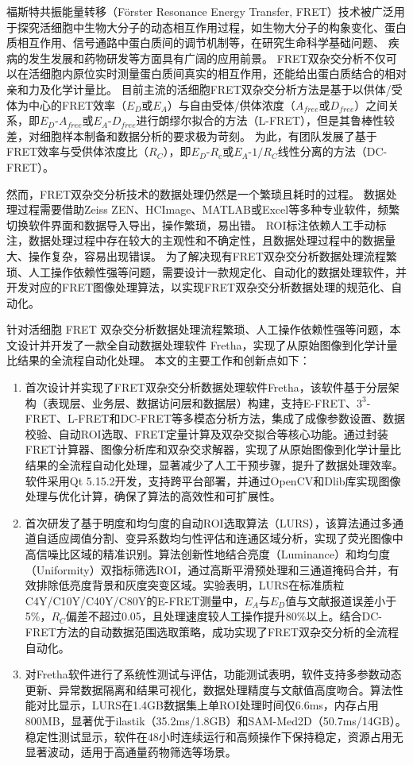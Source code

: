 \begin{cabstract}

\ifshowtext
福斯特共振能量转移（Förster Resonance Energy Transfer, FRET）技术被广泛用于探究活细胞中生物大分子的动态相互作用过程，如生物大分子的构象变化、蛋白质相互作用、信号通路中蛋白质间的调节机制等，在研究生命科学基础问题、 疾病的发生发展和药物研发等方面具有广阔的应用前景。
FRET双杂交分析不仅可以在活细胞内原位实时测量蛋白质间真实的相互作用，还能给出蛋白质结合的相对亲和力及化学计量比。
目前主流的活细胞FRET双杂交分析方法是基于以供体/受体为中心的FRET效率（$E_D$或$E_A$）与自由受体/供体浓度（$A_{free}$或$D_{free}$）之间关系，即$E_D$-$A_{free}$或$E_A$-$D_{free}$进行朗缪尔拟合的方法（L-FRET），但是其鲁棒性较差，对细胞样本制备和数据分析的要求极为苛刻。
为此，有团队发展了基于FRET效率与受供体浓度比（$R_C$），即$E_D$-$R_c$或$E_A$-$1/R_C$线性分离的方法（DC-FRET）。

然而，FRET双杂交分析技术的数据处理仍然是一个繁琐且耗时的过程。
数据处理过程需要借助Zeiss ZEN、HCImage、MATLAB或Excel等多种专业软件，频繁切换软件界面和数据导入导出，操作繁琐，易出错。
ROI标注依赖人工手动标注，数据处理过程中存在较大的主观性和不确定性，且数据处理过程中的数据量大、操作复杂，容易出现错误。
为了解决现有FRET双杂交分析数据处理流程繁琐、人工操作依赖性强等问题，需要设计一款规定化、自动化的数据处理软件，并开发对应的FRET图像处理算法，以实现FRET双杂交分析数据处理的规范化、自动化。

针对活细胞 FRET 双杂交分析数据处理流程繁琐、人工操作依赖性强等问题，本文设计并开发了一款全自动数据处理软件 Fretha，实现了从原始图像到化学计量比结果的全流程自动化处理。
本文的主要工作和创新点如下：
\begin{enumerate}
  \item 首次设计并实现了FRET双杂交分析数据处理软件Fretha，该软件基于分层架构（表现层、业务层、数据访问层和数据层）构建，支持E-FRET、$3^3$-FRET、L-FRET和DC-FRET等多模态分析方法，集成了成像参数设置、数据校验、自动ROI选取、FRET定量计算及双杂交拟合等核心功能。通过封装FRET计算器、图像分析库和双杂交求解器，实现了从原始图像到化学计量比结果的全流程自动化处理，显著减少了人工干预步骤，提升了数据处理效率。软件采用Qt 5.15.2开发，支持跨平台部署，并通过OpenCV和Dlib库实现图像处理与优化计算，确保了算法的高效性和可扩展性。
  \item 首次研发了基于明度和均匀度的自动ROI选取算法（LURS），该算法通过多通道自适应阈值分割、变异系数均匀性评估和连通区域分析，实现了荧光图像中高信噪比区域的精准识别。算法创新性地结合亮度（Luminance）和均匀度（Uniformity）双指标筛选ROI，通过高斯平滑预处理和三通道掩码合并，有效排除低亮度背景和灰度突变区域。实验表明，LURS在标准质粒C4Y/C10Y/C40Y/C80Y的E-FRET测量中，$E_{A}$与$E_{D}$值与文献报道误差小于5\%，$R_{C}$偏差不超过0.05，且处理速度较人工操作提升80\%以上。结合DC-FRET方法的自动数据范围选取策略，成功实现了FRET双杂交分析的全流程自动化。
  \item 对Fretha软件进行了系统性测试与评估，功能测试表明，软件支持多参数动态更新、异常数据隔离和结果可视化，数据处理精度与文献值高度吻合。算法性能对比显示，LURS在1.4GB数据集上单ROI处理时间仅6.6ms，内存占用800MB，显著优于ilastik（35.2ms/1.8GB）和SAM-Med2D（50.7ms/14GB）。稳定性测试显示，软件在48小时连续运行和高频操作下保持稳定，资源占用无显著波动，适用于高通量药物筛选等场景。
\end{enumerate}


\end{cabstract}
